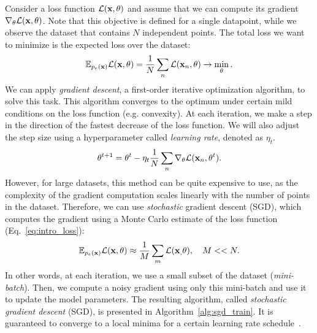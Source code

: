 Consider a loss function $\mathcal{L}({\mathbf{x}}, \theta)$ and assume that we can compute its gradient $\nabla_\theta \mathcal{L}({\mathbf{x}}, \theta)$. Note that this objective is defined for a single datapoint, while we observe the dataset that contains $N$ independent points. 
The total loss we want to minimize is the expected loss over the dataset:
\begin{equation}\label{eq:intro_loss}
\E_{p_e(\rvx)} \mathcal{L}(\rvx, \theta) = \frac1N \sum_n \mathcal{L}(\rvx_n, \theta) \rightarrow \min_{\theta}.
\end{equation}
We can apply \textit{gradient descent}, a first-order iterative optimization algorithm, to solve this task. This algorithm converges to the optimum under certain mild conditions on the loss function (e.g. convexity). At each iteration, we make a step in the direction of the fastest decrease of the loss function. We will also adjust the step size using a hyperparameter called \textit{learning rate}, denoted as $\eta_t$.
\begin{equation}\label{eq:intro_gd}
    \theta^{t+1} = \theta^{t} - \eta_{t} \frac1N \sum_n \nabla_{\theta}\mathcal{L}(\rvx_n, \theta^{t}).
\end{equation}
However, for large datasets, this method can be quite expensive to use, as the complexity of the gradient computation scales linearly with the number of points in the dataset. 
Therefore, we can use \textit{stochastic} gradient descent (SGD), which computes the gradient using a Monte Carlo estimate of the loss function (Eq.~\ref{eq:intro_loss}):
\begin{equation}
\mathbb{E}_{p_e({\mathbf{x}})} \mathcal{L}({\mathbf{x}}, \theta) \approx \frac1M \sum_m \mathcal{L}({\mathbf{x}}_, \theta), \quad M << N.
\end{equation}
In other words, at each iteration, we use a small subset of the dataset (\textit{mini-batch}). Then, we compute a noisy gradient using only this mini-batch and use it to update the model parameters. The resulting algorithm, called \textit{stochastic gradient descent} (SGD), is presented in Algorithm~\ref{alg:sgd_train}. It is guaranteed to converge to a local minima for a certain learning rate schedule~\citep{robbins1951stochastic}.

